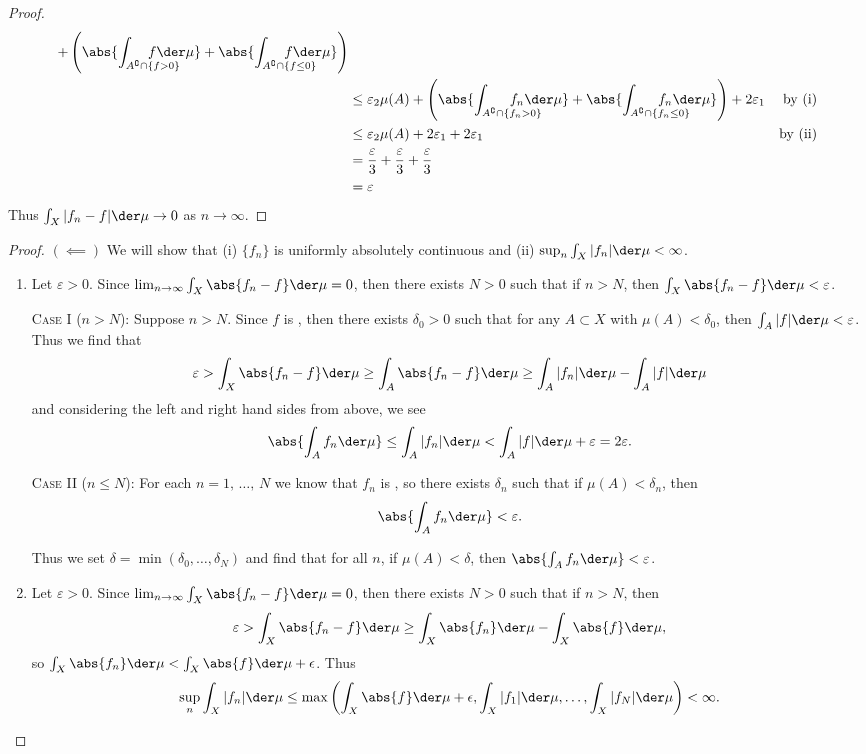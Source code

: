 \documentclass[12pt,letterpaper]{article}
\begin{document}
\begin{proof}
\begin{align*}
  + \left( \abs{\int_{A^\complement\cap\{f >   0\} }\hspace*{-2.5em}f\der\mu} +  \abs{\int_{A^\complement\cap\{f\leq 0\} }\hspace*{-2.5em}f\der\mu} \right) \\
%
&\leq \varepsilon_2\mu(A) 
  + \left( \abs{\int_{A^\complement\cap\{f_n >   0\} }\hspace*{-2.5em}f_n\der\mu} +  \abs{\int_{A^\complement\cap\{f_n\leq 0\} }\hspace*{-2.5em}f_n\der\mu} \right) 
  + 2\varepsilon_1
  & \text{by (i)} \\
&\leq \varepsilon_2\mu(A) + 2\varepsilon_1 + 2\varepsilon_1 & \text{by (ii)} \\
&= \frac{\varepsilon}{3} + \frac{\varepsilon}{3} + \frac{\varepsilon}{3} \\
&= \varepsilon
\end{align*}  
Thus $\int_X|f_n-f|\der\mu  \to 0$ as $n\to\infty$.
\end{proof}

\pagebreak
\begin{proof}$(\impliedby)$
We will show that (i) $\{f_n\}$ is uniformly absolutely continuous and (ii) ${\sup_n\int_X |f_n| \der\mu <\infty}$. 
\begin{enumerate}[label=(\roman*)]
\item Let $\varepsilon>0$. Since $\lim_{n\to\infty}\int_X \abs{f_n-f}\der\mu = 0$, then there exists $N>0$ such that if $n>N$, then ${\int_X\abs{f_n-f}\der\mu < \varepsilon}$. 

\textsc{Case I} ($n>N$): Suppose $n>N$. Since $f$ is \musummable{}, then there exists $\delta_0 >0$ such that for any $A\subset X$ with $\mu(A)<\delta_0 $, then $\int_A|f|\der\mu<\varepsilon$. Thus we find that 
$$
\varepsilon
>
\int_X\abs{f_n-f}\der\mu 
\geq
\int_A\abs{f_n-f}\der\mu 
\geq
\int_A|f_n|\der\mu-\int_A|f|\der\mu 
$$
and considering the left and right hand sides from above, we see
$$\abs{\int_A f_n \der \mu} \leq \int_A|f_n|\der\mu < \int_A|f|\der\mu + \varepsilon = 2\varepsilon.$$

\textsc{Case II} ($n\leq N$): For each $n = 1,\, \dots,\, N$ we know that $f_n$ is \musummable{}, so there exists $\delta_n$ such that if $\mu(A)<\delta_n$, then 
$$\abs{\int_A f_n \der\mu}<\varepsilon.$$ 

Thus we set $\delta = \min(\delta_0, \dots, \delta_N)$ and find that for all $n$, if $\mu(A)<\delta$, then $\abs{\int_A f_n\der\mu }<\varepsilon$. \qedwhite

\item Let $\varepsilon>0$. Since $\lim_{n\to\infty}\int_X\abs{f_n-f}\der\mu=0$, then there exists $N>0$ such that if $n>N$, then 
$$\varepsilon>\int_X\abs{f_n-f}\der\mu\geq \int_X\abs{f_n}\der\mu - \int_X\abs{f}\der\mu,$$ 
so $\int_X\abs{f_n}\der\mu < \int_X\abs{f}\der\mu + \epsilon$. Thus 
$$\sup_n\int_X|f_n|\der\mu \leq \max\left(\int_X\abs{f}\der\mu + \epsilon, \int_X|f_1|\der\mu, \dots, \int_X|f_N|\der\mu \right)<\infty.$$
\qedhere
\end{enumerate}
\end{proof}

\pagebreak
{}
\end{document}
